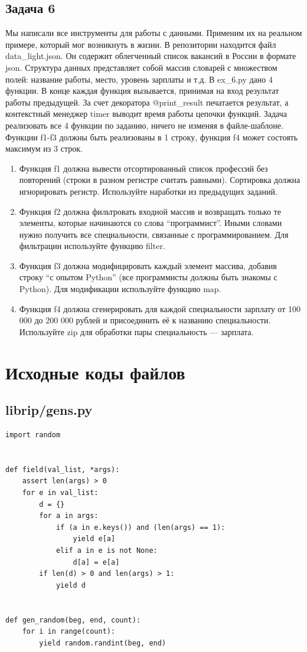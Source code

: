 \documentclass{article}
\begin{document}
\subsection{Задача 6}
Мы написали все инструменты для работы с данными. Применим их на реальном примере, который мог возникнуть в жизни. В репозитории находится файл data\_light.json. Он содержит облегченный список вакансий в России в формате json.
Структура данных представляет собой массив словарей с множеством полей: название работы, место, уровень зарплаты и т.д.
В ex\_6.py дано 4 функции. В конце каждая функция вызывается, принимая на вход результат работы предыдущей. За счет декоратора @print\_result печатается результат, а контекстный менеджер timer выводит время работы цепочки функций.
Задача реализовать все 4 функции по заданию, ничего не изменяя в файле-шаблоне. Функции f1-f3 должны быть реализованы в 1 строку, функция f4 может состоять максимум из 3 строк.

\begin{enumerate}
    \item Функция f1 должна вывести отсортированный список профессий без повторений (строки в разном регистре считать равными). Сортировка должна игнорировать регистр. Используйте наработки из предыдущих заданий.
    \item Функция f2 должна фильтровать входной массив и возвращать только те элементы, которые начинаются со слова “программист”. Иными словами нужно получить все специальности, связанные с программированием. Для фильтрации используйте функцию filter.
    \item Функция f3 должна модифицировать каждый элемент массива, добавив строку “с опытом Python” (все программисты должны быть знакомы с Python). Для модификации используйте функцию map.
    \item Функция f4 должна сгенерировать для каждой специальности зарплату от 100 000 до 200 000 рублей и присоединить её к названию специальности. Используйте zip для обработки пары специальность — зарплата.
\end{enumerate}
\newpage
\section{Исходные коды файлов}
\subsection{librip/gens.py}
\begin{verbatim}
import random


def field(val_list, *args):
    assert len(args) > 0
    for e in val_list:
        d = {}
        for a in args:
            if (a in e.keys()) and (len(args) == 1):
                yield e[a]
            elif a in e is not None:
                d[a] = e[a]
        if len(d) > 0 and len(args) > 1:
            yield d


def gen_random(beg, end, count):
    for i in range(count):
        yield random.randint(beg, end)

\end{verbatim}
\end{document}
